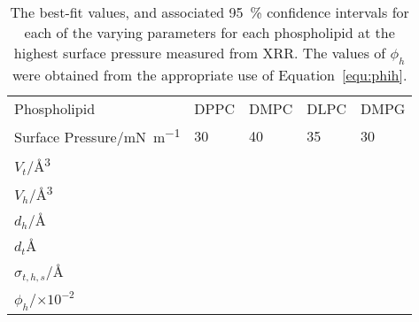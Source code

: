 %
%
\begin{table}
    \centering
    \small
    \caption{The best-fit values, and associated \SI{95}{\percent} confidence intervals for each of the varying parameters for each phospholipid at the highest surface pressure measured from XRR. The values of $\phi_h$ were obtained from the appropriate use of Equation~\ref{equ:phih}.}
    \label{tab:xrrref4}
    \begin{tabular}{l | l l l l}
        \toprule
        Phospholipid & DPPC & DMPC & DLPC & DMPG \\
        Surface Pressure/\si{\milli\newton\per\meter} & 30 & 40 & 35 & 30 \\
        \midrule
        $V_t$/\si{\angstrom\cubed} &  &  &  &  \\
        $V_h$/\si{\angstrom\cubed} &  &  &  &  \\
        $d_h$/\si{\angstrom} &  &  &  &  \\
        \midrule
        $d_t$\si{\angstrom} &  &  &  &  \\
        $\sigma_{t,h,s}$/\si{\angstrom} &  &  &  &  \\
        \midrule
        $\phi_h$/$\times 10^{-2}$ &  &  &  &  \\
        \bottomrule
    \end{tabular}
\end{table}
%


